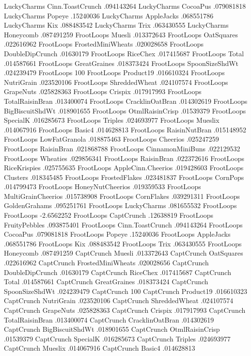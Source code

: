 LuckyCharms	Cinn.ToastCrunch	.094143264
LuckyCharms	CocoaPus	.079081818
LuckyCharms	Popeye	.15240036
LuckyCharms	AppleJacks	.068551786
LuckyCharms	Kix	.088483542
LuckyCharms	Trix	.063430555
LuckyCharms	Honeycomb	.087491259
FrootLoops	Muesli	.013372643
FrootLoops	OatSquares	.022616962
FrootLoops	FrostedMiniWheats	.020028658
FrootLoops	DoubleDipCrunch	.01630179
FrootLoops	RiceChex	.017415687
FrootLoops	Total	.014587661
FrootLoops	GreatGraines	.018373424
FrootLoops	SpoonSizeShdWt	.024239479
FrootLoops	100%
FrootLoops	Product19	.016610324
FrootLoops	NutriGrain	.023520106
FrootLoops	ShreddedWheat	.024107574
FrootLoops	GrapeNuts	.025828363
FrootLoops	Crispix	.017917993
FrootLoops	TotalRaisinBran	.013400074
FrootLoops	CracklinOatBran	.014302619
FrootLoops	BigBiscuitShdWt	.018901655
FrootLoops	OtmlRaisinCrisp	.01539379
FrootLoops	SpecialK	.016285673
FrootLoops	Triples	.024693977
FrootLoops	Mueslix	.014067916
FrootLoops	Basic4	.014628813
FrootLoops	RaisinNutBran	.015148952
FrootLoops	LowFatGranola	.018875463
FrootLoops	Cheerios	.025247259
FrootLoops	RaisinBran	.021868788
FrootLoops	CinnamonMiniBuns	.022129532
FrootLoops	Wheaties	.029856341
FrootLoops	RaisinBran	.022372616
FrootLoops	RiceKrispies	.025755635
FrootLoops	AppleCinn.Cheerios	.019428603
FrootLoops	Clusters	.018345485
FrootLoops	FrostedFlakes	.023481837
FrootLoops	CornPops	.014799473
FrootLoops	HoneyNutCheerios	.019359533
FrootLoops	MultiGrainCheerios	.015738908
FrootLoops	CornFlakes	.039291311
FrootLoops	GoldenGrahams	.095251761
FrootLoops	LuckyCharms	.081655532
FrootLoops	FrootLoops	-2.6562252
FrootLoops	CaptCrunch	.12638819
FrootLoops	FruityPebbles	.093875401
FrootLoops	Cinn.ToastCrunch	.094143264
FrootLoops	CocoaPus	.079081818
FrootLoops	Popeye	.15240036
FrootLoops	AppleJacks	.068551786
FrootLoops	Kix	.088483542
FrootLoops	Trix	.063430555
FrootLoops	Honeycomb	.087491259
CaptCrunch	Muesli	.013372643
CaptCrunch	OatSquares	.022616962
CaptCrunch	FrostedMiniWheats	.020028656
CaptCrunch	DoubleDipCrunch	.01630179
CaptCrunch	RiceChex	.017415687
CaptCrunch	Total	.014587661
CaptCrunch	GreatGraines	.018373424
CaptCrunch	SpoonSizeShdWt	.024239479
CaptCrunch	100%
CaptCrunch	Product19	.016610323
CaptCrunch	NutriGrain	.023520106
CaptCrunch	ShreddedWheat	.024107574
CaptCrunch	GrapeNuts	.025828363
CaptCrunch	Crispix	.017917993
CaptCrunch	TotalRaisinBran	.013400074
CaptCrunch	CracklinOatBran	.014302619
CaptCrunch	BigBiscuitShdWt	.018901655
CaptCrunch	OtmlRaisinCrisp	.01539379
CaptCrunch	SpecialK	.016285673
CaptCrunch	Triples	.024693977
CaptCrunch	Mueslix	.014067916
CaptCrunch	Basic4	.014628813
